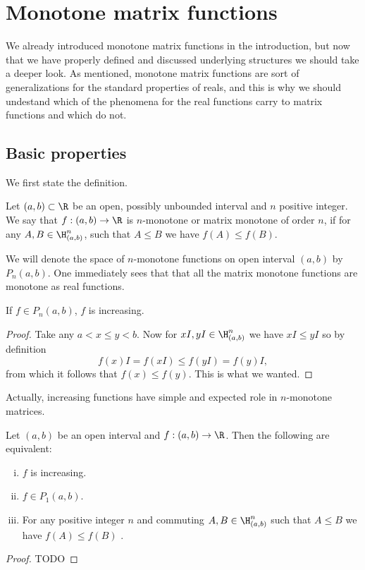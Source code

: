 \chapter{Monotone matrix functions}

We already introduced monotone matrix functions in the introduction, but now that we have properly defined and discussed underlying structures we should take a deeper look. As mentioned, monotone matrix functions are sort of generalizations for the standard properties of reals, and this is why we should undestand which of the phenomena for the real functions carry to matrix functions and which do not.

\section{Basic properties}

We first state the definition.

\begin{maar}
	Let $(a,b) \subset \R$ be an open, possibly unbounded interval and $n$ positive integer. We say that $f : (a, b) \to \R$ is $n$-monotone or matrix monotone of order $n$, if for any $A, B \in \H^{n}_{(a, b)}$, such that $A \leq B$ we have $f(A) \leq f(B)$.
\end{maar}

We will denote the space of $n$-monotone functions on open interval $(a, b)$ by $P_{n}(a, b)$. One immediately sees that that all the matrix monotone functions are monotone as real functions.

\begin{prop}
	If $f \in P_{n}(a, b)$, $f$ is increasing.
\end{prop}
\begin{proof}
	Take any $a < x \leq y < b$. Now for $xI, yI \in \H^{n}_{(a, b)}$ we have $x I \leq y I$ so by definition
	\[
		f(x) I = f(xI) \leq f(y I) = f(y) I,
	\]
	from which it follows that $f(x) \leq f(y)$. This is what we wanted.
\end{proof}

Actually, increasing functions have simple and expected role in $n$-monotone matrices.

\begin{prop}
	Let $(a, b)$ be an open interval and $f : (a, b) \to \R$. Then the following are equivalent:
	\begin{enumerate}[(i)]
		\item $f$ is increasing.
		\item $f \in P_{1}(a, b)$.
		\item For any positive integer $n$ and commuting $A, B \in \H^{n}_{(a, b)}$ such that $A \leq B$ we have $f(A) \leq f(B)$ .
	\end{enumerate}
\end{prop}
\begin{proof}
	TODO
\end{proof}

